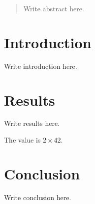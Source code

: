 \documentclass{article}
\begin{document}
\begin{abstract}
Write abstract here.
\end{abstract}

\section{Introduction}

Write introduction here.

\section{Results}

Write results here.

The value is $2 \times 42$.

\section{Conclusion}

Write conclusion here.
\end{document}
